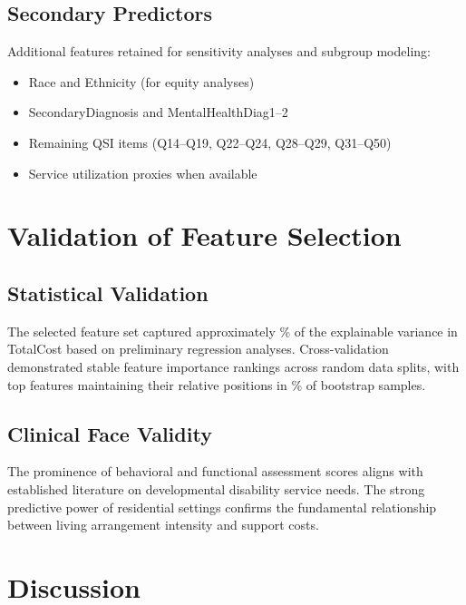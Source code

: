 \subsection{Secondary Predictors}
\label{subsec:secondary-predictors}

Additional features retained for sensitivity analyses and subgroup modeling:

\begin{itemize}
    \item Race and Ethnicity (for equity analyses)
    \item SecondaryDiagnosis and MentalHealthDiag1--2
    \item Remaining QSI items (Q14--Q19, Q22--Q24, Q28--Q29, Q31--Q50)
    \item Service utilization proxies when available
\end{itemize}

\section{Validation of Feature Selection}
\label{sec:validation}

\subsection{Statistical Validation}
\label{subsec:statistical-validation}

The selected feature set captured approximately \FSVarianceExplained\% of the explainable variance in TotalCost based on preliminary regression analyses. Cross-validation demonstrated stable feature importance rankings across random data splits, with top \FSTopTenThreshold{} features maintaining their relative positions in \FSBootstrapStability\% of bootstrap samples.

\subsection{Clinical Face Validity}
\label{subsec:clinical-validity}

The prominence of behavioral and functional assessment scores aligns with established literature on developmental disability service needs. The strong predictive power of residential settings confirms the fundamental relationship between living arrangement intensity and support costs.

\section{Discussion}
\label{sec:feature-selection-discussion}

